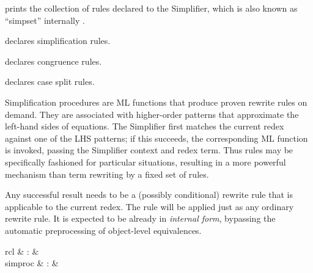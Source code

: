 \begin{isabellebody}
\begin{isamarkuptext}
  \begin{description}

  \item \hyperlink{command.print-simpset}{\mbox{}} prints the collection of rules
  declared to the Simplifier, which is also known as ``simpset''
  internally \cite{isabelle-ref}.

  \item \hyperlink{attribute.simp}{\mbox{}} declares simplification rules.

  \item \hyperlink{attribute.cong}{\mbox{}} declares congruence rules.

  \item \hyperlink{attribute.split}{\mbox{}} declares case split rules.

  \end{description}%
\end{isamarkuptext}%
\isamarkuptrue%
%
\isamarkuptrue%
%
\begin{isamarkuptext}%
Simplification procedures are ML functions that produce proven
  rewrite rules on demand.  They are associated with higher-order
  patterns that approximate the left-hand sides of equations.  The
  Simplifier first matches the current redex against one of the LHS
  patterns; if this succeeds, the corresponding ML function is
  invoked, passing the Simplifier context and redex term.  Thus rules
  may be specifically fashioned for particular situations, resulting
  in a more powerful mechanism than term rewriting by a fixed set of
  rules.

  Any successful result needs to be a (possibly conditional) rewrite
  rule  that is applicable to the current redex.  The
  rule will be applied just as any ordinary rewrite rule.  It is
  expected to be already in \emph{internal form}, bypassing the
  automatic preprocessing of object-level equivalences.

  \begin{matharray}{rcl}
    \hypertarget{command.simproc-setup}{\hyperlink{command.simproc-setup}{\mbox{}}} & : &  \\
    simproc & : &  \\
  \end{matharray}


\end{isamarkuptext}
\end{isabellebody}

